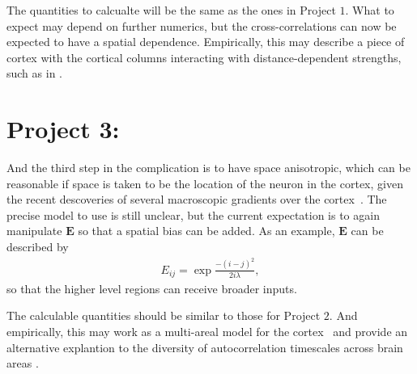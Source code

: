 \documentclass[11pt,openany,oneside]{article} %
\newcommand{\bd}[1]{\boldsymbol{#1}}%
\begin{document}
The quantities to calcualte will be the same as the ones in Project $1$.  What to expect may depend
on further numerics, but the cross-correlations can now be expected to have a spatial dependence.
Empirically, this may describe a piece of cortex with the cortical columns interacting with
distance-dependent strengths, such as in \citet{holmgren2003Pyramidal}.

\section{Project 3:}
And the third step in the complication is to have space anisotropic, which can be reasonable if
space is taken to be the location of the neuron in the cortex, given the recent descoveries of
several macroscopic gradients over the cortex~\cite{wang2020Macroscopic}.  The precise model to use
is still unclear, but the current expectation is to again manipulate $\bd{E}$ so that a spatial bias
can be added.  As an example, $\bd{E}$ can be described by
\begin{align}
  \label{eq:anisotropicSpace}
  E_{ij} = \exp\frac{-(i-j)^2}{2i\lambda},
\end{align}
so that the higher level regions can receive broader inputs.

The calculable quantities should be similar to those for Project $2$.  And empirically, this may
work as a multi-areal model for the cortex~\cite{wang2020Macroscopic} and provide an alternative
explantion to the diversity of autocorrelation timescales across brain areas
\cite{murray2014Hierarchy}.

 

\end{document}
